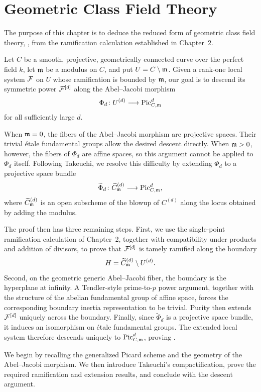 \chapter{Geometric Class Field Theory}\label{section:gcft}

The purpose of this chapter is to deduce the reduced form of geometric class
field theory, , from the ramification calculation
established in Chapter~2.

Let $C$ be a smooth, projective, geometrically connected curve over the
perfect field $k$, let $\mdls$ be a modulus on $C$, and put
$U=C\setminus\mdls$. Given a rank-one local system $\cF$ on $U$ whose
ramification is bounded by $\mdls$, our goal is to descend its symmetric
power $\cF^{[d]}$ along the Abel--Jacobi morphism
\[
    \Phi_d\colon U^{(d)}\longrightarrow\PicCm[d]
\]
for all sufficiently large $d$.

When $\mdls=0$, the fibers of the Abel--Jacobi morphism are projective
spaces. Their trivial \'etale fundamental groups allow the desired descent
directly. When $\mdls>0$, however, the fibers of $\Phi_d$ are affine spaces,
so this argument cannot be applied to $\Phi_d$ itself. Following Takeuchi,
we resolve this difficulty by extending $\Phi_d$ to a projective space
bundle
\[
    \widetilde\Phi_d\colon
    \widetilde C_{\mdls}^{(d)}
    \longrightarrow \PicCm[d],
\]
where $\widetilde C_{\mdls}^{(d)}$ is an open subscheme of the blowup of
$C^{(d)}$ along the locus obtained by adding the modulus.

The proof then has three remaining steps. First, we use the single-point
ramification calculation of Chapter~2, together with compatibility under
products and addition of divisors, to prove that $\cF^{[d]}$ is tamely
ramified along the boundary
\[
    H=\widetilde C_{\mdls}^{(d)}\setminus U^{(d)}.
\]
Second, on the geometric generic Abel--Jacobi fiber, the boundary is the
hyperplane at infinity. A Tendler-style prime-to-$p$ power argument,
together with the structure of the abelian fundamental group of affine
space, forces the corresponding boundary inertia representation to be
trivial. Purity then extends $\cF^{[d]}$ uniquely across the boundary.
Finally, since $\widetilde\Phi_d$ is a projective space bundle, it induces
an isomorphism on \'etale fundamental groups. The extended local system
therefore descends uniquely to $\PicCm[d]$, proving
.

We begin by recalling the generalized Picard scheme and the geometry of the
Abel--Jacobi morphism. We then introduce Takeuchi's compactification, prove
the required ramification and extension results, and conclude with the
descent argument.

